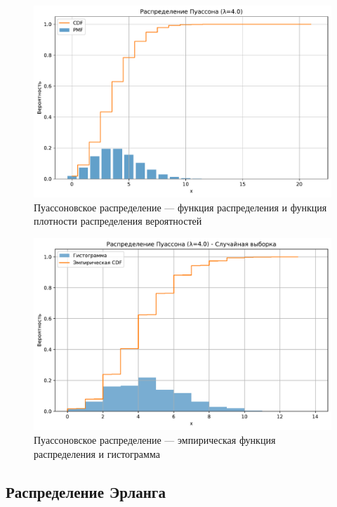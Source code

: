 \documentclass[a4paper,oneside,14pt]{extarticle}
\begin{document}
\begin{figure}[H]
	\centering
	\includegraphics[scale=0.7]{img/th_poisson.pdf}
	\caption{Пуассоновское распределение --- функция распределения и функция плотности распределения вероятностей}
	\label{fig:}
\end{figure}

\begin{figure}[H]
	\centering
	\includegraphics[scale=0.7]{img/emp_poisson.pdf}
	\caption{Пуассоновское распределение --- эмпирическая функция распределения и гистограмма}
	\label{fig:}
\end{figure}

\subsection{Распределение Эрланга}
\end{document}
